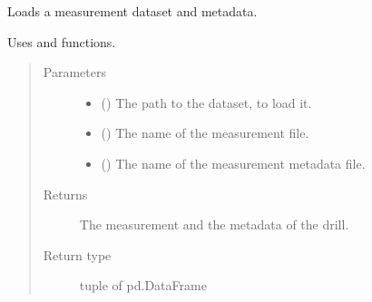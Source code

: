 \documentclass[letterpaper,10pt,english]{sphinxmanual}
\begin{document}
\begin{fulllineitems}
\label{\detokenize{anoog.io:anoog.io.csv_io.read_csv_dataset}}
\sphinxAtStartPar
Loads a measurement dataset and meta\sphinxhyphen{}data.

\sphinxAtStartPar
Uses {\hyperref[\detokenize{anoog.io:anoog.io.csv_io.read_csv}]{}} and {\hyperref[\detokenize{anoog.io:anoog.io.csv_io.read_metadata}]{}} functions.
\begin{quote}\begin{description}
\item[{Parameters}] \leavevmode\begin{itemize}
\item {} 
\sphinxAtStartPar
{} () \textendash{} The path to the dataset, to load it.

\item {} 
\sphinxAtStartPar
{} (\sphinxstyleliteralemphasis{\sphinxupquote{, }}) \textendash{} The name of the measurement file.

\item {} 
\sphinxAtStartPar
{} (\sphinxstyleliteralemphasis{\sphinxupquote{, }}) \textendash{} The name of the measurement metadata file.

\end{itemize}

\item[{Returns}] \leavevmode
\sphinxAtStartPar
The measurement and the metadata of the drill.

\item[{Return type}] \leavevmode
\sphinxAtStartPar
tuple of pd.DataFrame

\end{description}\end{quote}

\end{fulllineitems}
\end{document}
